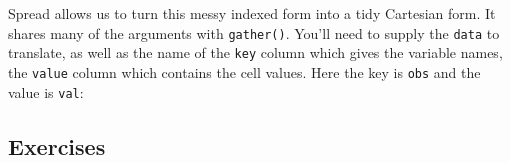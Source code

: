 \begin{Shaded}
\begin{Highlighting}[]
\StringTok{ }\NormalTok{(}
   \NormalTok{(}\NormalTok{:}\NormalTok{, }\NormalTok{),}
   \NormalTok{(}\NormalTok{(}\NormalTok{, }\NormalTok{), } \NormalTok{),}
   \NormalTok{(}\NormalTok{(}\NormalTok{, }\NormalTok{, }\NormalTok{), }\NormalTok{(}\NormalTok{, }\NormalTok{, }\NormalTok{))}
\NormalTok{)}
\CommentTok{#> }
\end{Highlighting}
\end{Shaded}

Spread allows us to turn this messy indexed form into a tidy Cartesian
form. It shares many of the arguments with \texttt{gather()}. You'll
need to supply the \texttt{data} to translate, as well as the name of
the \texttt{key} column which gives the variable names, the
\texttt{value} column which contains the cell values. Here the key is
\texttt{obs} and the value is \texttt{val}:

\begin{Shaded}
\begin{Highlighting}[]
  
\CommentTok{#> }
\end{Highlighting}
\end{Shaded}

\subsection{Exercises}

